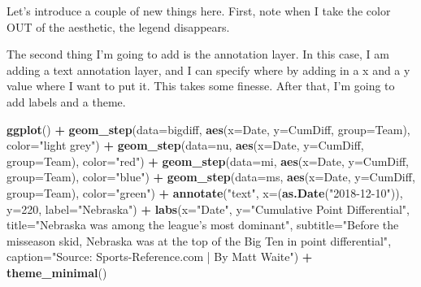 \documentclass[
]{book}
\newenvironment{Shaded}{\begin{snugshade}}{\end{snugshade}}
\newcommand{\DataTypeTok}[1]{\textcolor[rgb]{0.13,0.29,0.53}{#1}}
\newcommand{\DecValTok}[1]{\textcolor[rgb]{0.00,0.00,0.81}{#1}}
\newcommand{\KeywordTok}[1]{\textcolor[rgb]{0.13,0.29,0.53}{\textbf{#1}}}
\newcommand{\NormalTok}[1]{#1}
\newcommand{\OperatorTok}[1]{\textcolor[rgb]{0.81,0.36,0.00}{\textbf{#1}}}
\newcommand{\StringTok}[1]{\textcolor[rgb]{0.31,0.60,0.02}{#1}}
\begin{document}
Let's introduce a couple of new things here. First, note when I take the color OUT of the aesthetic, the legend disappears.

The second thing I'm going to add is the annotation layer. In this case, I am adding a text annotation layer, and I can specify where by adding in a x and a y value where I want to put it. This takes some finesse. After that, I'm going to add labels and a theme.

\begin{Shaded}
\begin{Highlighting}[]
\KeywordTok{ggplot}\NormalTok{() }\OperatorTok{+}\StringTok{ }
\StringTok{  }\KeywordTok{geom_step}\NormalTok{(}\DataTypeTok{data=}\NormalTok{bigdiff, }\KeywordTok{aes}\NormalTok{(}\DataTypeTok{x=}\NormalTok{Date, }\DataTypeTok{y=}\NormalTok{CumDiff, }\DataTypeTok{group=}\NormalTok{Team), }\DataTypeTok{color=}\StringTok{"light grey"}\NormalTok{) }\OperatorTok{+}
\StringTok{  }\KeywordTok{geom_step}\NormalTok{(}\DataTypeTok{data=}\NormalTok{nu, }\KeywordTok{aes}\NormalTok{(}\DataTypeTok{x=}\NormalTok{Date, }\DataTypeTok{y=}\NormalTok{CumDiff, }\DataTypeTok{group=}\NormalTok{Team), }\DataTypeTok{color=}\StringTok{"red"}\NormalTok{) }\OperatorTok{+}\StringTok{ }
\StringTok{  }\KeywordTok{geom_step}\NormalTok{(}\DataTypeTok{data=}\NormalTok{mi, }\KeywordTok{aes}\NormalTok{(}\DataTypeTok{x=}\NormalTok{Date, }\DataTypeTok{y=}\NormalTok{CumDiff, }\DataTypeTok{group=}\NormalTok{Team), }\DataTypeTok{color=}\StringTok{"blue"}\NormalTok{) }\OperatorTok{+}\StringTok{ }
\StringTok{  }\KeywordTok{geom_step}\NormalTok{(}\DataTypeTok{data=}\NormalTok{ms, }\KeywordTok{aes}\NormalTok{(}\DataTypeTok{x=}\NormalTok{Date, }\DataTypeTok{y=}\NormalTok{CumDiff, }\DataTypeTok{group=}\NormalTok{Team), }\DataTypeTok{color=}\StringTok{"green"}\NormalTok{) }\OperatorTok{+}
\StringTok{  }\KeywordTok{annotate}\NormalTok{(}\StringTok{"text"}\NormalTok{, }\DataTypeTok{x=}\NormalTok{(}\KeywordTok{as.Date}\NormalTok{(}\StringTok{"2018-12-10"}\NormalTok{)), }\DataTypeTok{y=}\DecValTok{220}\NormalTok{, }\DataTypeTok{label=}\StringTok{"Nebraska"}\NormalTok{) }\OperatorTok{+}
\StringTok{  }\KeywordTok{labs}\NormalTok{(}\DataTypeTok{x=}\StringTok{"Date"}\NormalTok{, }\DataTypeTok{y=}\StringTok{"Cumulative Point Differential"}\NormalTok{, }\DataTypeTok{title=}\StringTok{"Nebraska was among the league's most dominant"}\NormalTok{, }\DataTypeTok{subtitle=}\StringTok{"Before the misseason skid, Nebraska was at the top of the Big Ten in point differential"}\NormalTok{, }\DataTypeTok{caption=}\StringTok{"Source: Sports-Reference.com | By Matt Waite"}\NormalTok{) }\OperatorTok{+}
\StringTok{  }\KeywordTok{theme_minimal}\NormalTok{()}
\end{Highlighting}
\end{Shaded}
\end{document}

